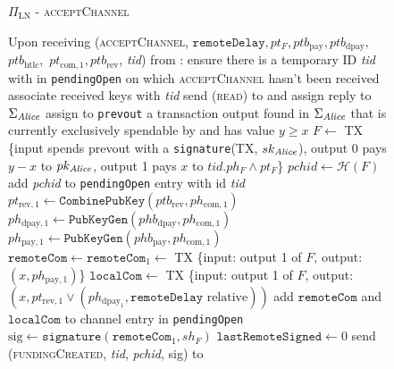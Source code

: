   \begin{figure}[H]
    \begin{protocolbox}{$\Pi_{\mathrm{LN}}$ - \textsc{acceptChannel}}
      \begin{algorithmic}[1]
        \State Upon receiving (\textsc{acceptChannel}, $\mathtt{remoteDelay},
        pt_F, ptb_{\mathrm{pay}}, ptb_{\mathrm{dpay}},$ $ptb_{\mathrm{htlc}},$
        $pt_{\mathrm{com}, 1}, ptb_{\mathrm{rev}}$, \textit{tid}) from \bob:
        \Indent
          \State ensure there is a temporary ID \textit{tid} with \bob{} in
          \texttt{pendingOpen} on which \textsc{acceptChannel} hasn't been
          received
          \State associate received keys with \textit{tid}
          \State send (\textsc{read}) to \ledger{} and assign reply to
          $\Sigma_{\mathit{Alice}}$
          \State assign to \texttt{prevout} a transaction output found in
          $\Sigma_{\mathit{Alice}}$ that is currently exclusively spendable by \alice{}
          and has value $y \geq x$
          \State $F \gets$ TX \{input spends prevout with a
          \texttt{signature}(TX, $sk_{\mathit{Alice}}$), output 0 pays $y - x$ to
          $pk_{\mathit{Alice}}$, output 1 pays $x$ to $\mathit{tid}.ph_F \wedge pt_F$\}
          \State $\mathit{pchid} \gets \mathcal{H}\left(F\right)$
          \State add \textit{pchid} to \texttt{pendingOpen} entry with id
          \textit{tid}
          \State $pt_{\mathrm{rev}, 1} \gets
          \mathtt{CombinePubKey}\left(ptb_{\mathrm{rev}}, ph_{\mathrm{com},
          1}\right)$
          \State $ph_{\mathrm{dpay}, 1} \gets
          \texttt{PubKeyGen}\left(phb_{\mathrm{dpay}}, ph_{\mathrm{com},
          1}\right)$
          \State $ph_{\mathrm{pay}, 1} \gets
          \texttt{PubKeyGen}\left(phb_{\mathrm{pay}}, ph_{\mathrm{com},
          1}\right)$
          \State $\mathtt{remoteCom} \gets \mathtt{remoteCom}_1 \gets$ TX
          \{input: output 1 of $F$, output: $\left(x, ph_{\mathrm{pay},
          1}\right)$\}
          \State $\mathtt{localCom} \gets$ TX \{input: output 1 of $F$, output:
          $\left(x, pt_{\mathrm{rev}, 1} \vee \left(ph_{\mathrm{dpay}_1},
          \mathtt{remoteDelay} \text{ relative}\right)\right)$
          \State add $\mathtt{remoteCom}$ and $\mathtt{localCom}$ to channel
          entry in \texttt{pendingOpen}
          \State $\mathrm{sig} \gets
          \mathtt{signature}\left(\mathtt{remoteCom}_1, sh_F\right)$
          \State $\mathtt{lastRemoteSigned} \gets 0$
          \State send (\textsc{fundingCreated}, \textit{tid},
          \textit{pchid}, sig) to \bob{}
        \EndIndent
      \end{algorithmic}
    \end{protocolbox}
    \caption{}
    \label{alg:protocol:open:acceptChannel}
  \end{figure}

